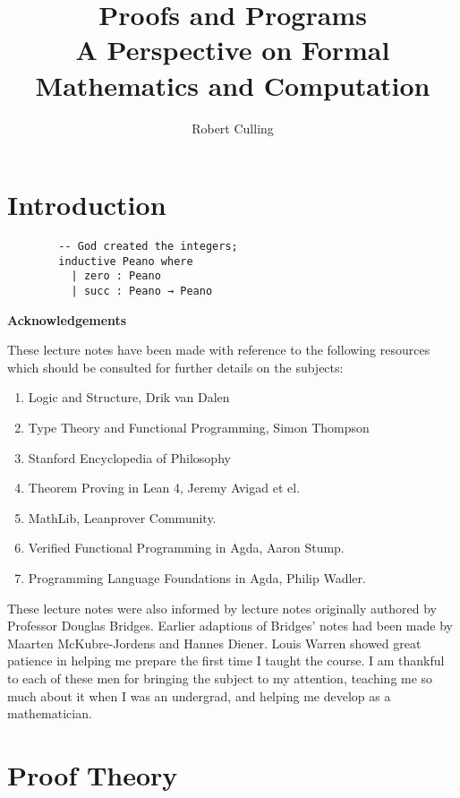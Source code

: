 \documentclass{book}
\title{Proofs and Programs \\
        \normalsize{A Perspective on Formal Mathematics and Computation}}
\author{Robert Culling}
\begin{document}
\maketitle

\tableofcontents

\chapter{Introduction}

    \begin{lstlisting}
        -- God created the integers;
        inductive Peano where
          | zero : Peano
          | succ : Peano → Peano
    \end{lstlisting} 
        
    \newpage
    {\bf Acknowledgements} 
    
    These lecture notes have been made with reference to the following resources which should be consulted for further details on the subjects: 

        \begin{enumerate}
            \item Logic and Structure, Drik van Dalen \cite{vDalen}
            \item Type Theory and Functional Programming, Simon Thompson \cite{thompson}
            \item Stanford Encyclopedia of Philosophy
            \item Theorem Proving in Lean 4, Jeremy Avigad et el.
            \item MathLib, Leanprover Community. 
            \item Verified Functional Programming in Agda, Aaron Stump.
            \item Programming Language Foundations in Agda, Philip Wadler. 
        \end{enumerate}    
    
    These lecture notes were also informed by lecture notes originally authored by Professor Douglas Bridges. Earlier adaptions of Bridges' notes had been made by Maarten McKubre-Jordens and Hannes Diener. Louis Warren showed great patience in helping me prepare the first time I taught the course. I am thankful to each of these men for bringing the subject to my attention, teaching me so much about it when I was an undergrad, and helping me develop as a mathematician. 

\chapter{Proof Theory}
\end{document}
